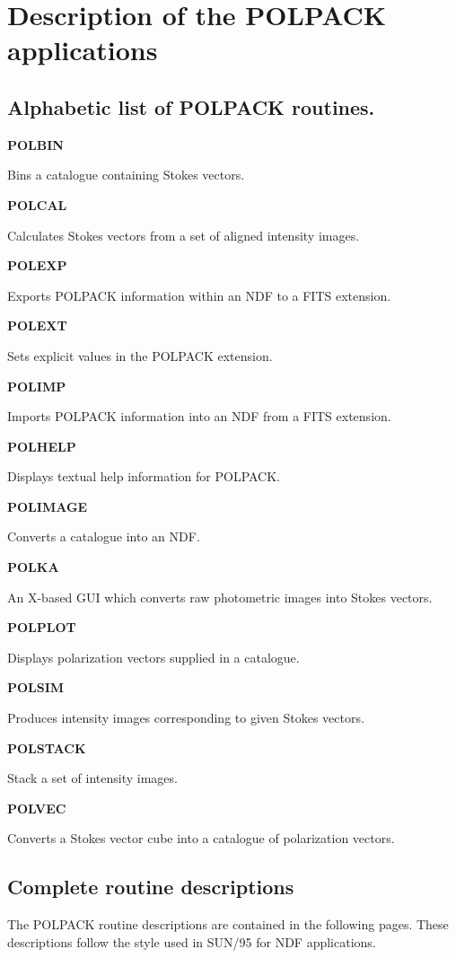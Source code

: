 \documentclass[twoside,11pt]{article}
\newenvironment{latexonly}{}{}
\newcommand{\xref}[3]{#1}
\renewcommand{\_}{\texttt{\symbol{95}}}
\newcommand{\quickdes}[3]{
                         \parbox{1.1in}{\bf #1}
                         \parbox{4.4in}{\raggedright #2 \dotfill}
                         \parbox{0.6in}{\pageref{#3}}
                         \vspace*{0.2in}}
\newcommand{\latexonlysubsection}[1]{\subsection{#1}}
\newcommand{\latexonlysubsection}[1]{#1}
\begin{document}
\section{ \label{APP:DESCRIPTION}Description of the POLPACK applications}
\begin{latexonly}
\latexonlysubsection{Alphabetic list of POLPACK routines.}
%
%
\quickdes{POLBIN}{Bins a catalogue containing Stokes vectors.}{ POLBIN }

\quickdes{POLCAL}{Calculates Stokes vectors from a set of aligned intensity images.}{ POLCAL }

\quickdes{POLEXP}{Exports POLPACK information within an NDF to a FITS extension.}{ POLEXP }

\quickdes{POLEXT}{Sets explicit values in the POLPACK extension.}{ POLEXT }

\quickdes{POLIMP}{Imports POLPACK information into an NDF from a FITS
extension.}{ POLEXP }

\quickdes{POLHELP}{Displays textual help information for POLPACK.}{
POLHELP }

\quickdes{POLIMAGE}{Converts a catalogue into an NDF.}{ POLIMAGE }

\quickdes{POLKA}{An X-based GUI which converts raw photometric images
into Stokes vectors.}{ POLKA }

\quickdes{POLPLOT}{Displays polarization vectors supplied in a
catalogue.}{ POLPLOT }

\quickdes{POLSIM}{Produces intensity images corresponding to given Stokes
vectors.}{ POLSIM }

\quickdes{POLSTACK}{Stack a set of intensity images.}{ POLSTACK }

\quickdes{POLVEC}{Converts a Stokes vector cube into a catalogue of
polarization vectors.}{ POLVEC }

\end{latexonly}

\subsection{Complete routine descriptions \label{descriptions}}

The POLPACK routine descriptions are contained in the following pages.
These descriptions follow the style used in \xref{SUN/95}{sun95}{ap_full}
for NDF applications.
\end{document}
